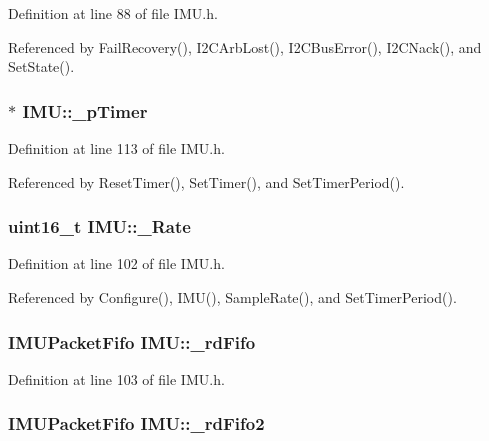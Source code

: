 Definition at line 88 of file IMU.h.



Referenced by FailRecovery(), I2CArbLost(), I2CBusError(), I2CNack(), and SetState().

\hypertarget{class_i_m_u_a16e73b1457a346aed16d4b61fae7f2c4}{
\subsubsection[{\_\-pTimer}]{$\ast$ {\bf IMU::\_\-pTimer}}}
\label{class_i_m_u_a16e73b1457a346aed16d4b61fae7f2c4}


Definition at line 113 of file IMU.h.



Referenced by ResetTimer(), SetTimer(), and SetTimerPeriod().

\hypertarget{class_i_m_u_aafe9be107385c7ccedeb1539cf6d7fce}{
\subsubsection[{\_\-Rate}]{\setlength{\rightskip}{0pt plus 5cm}uint16\_\-t {\bf IMU::\_\-Rate}}}
\label{class_i_m_u_aafe9be107385c7ccedeb1539cf6d7fce}


Definition at line 102 of file IMU.h.



Referenced by Configure(), IMU(), SampleRate(), and SetTimerPeriod().

\hypertarget{class_i_m_u_a43cbdffbfb85749212ede7f78ab6f1e0}{
\subsubsection[{\_\-rdFifo}]{\setlength{\rightskip}{0pt plus 5cm}IMUPacketFifo {\bf IMU::\_\-rdFifo}}}
\label{class_i_m_u_a43cbdffbfb85749212ede7f78ab6f1e0}


Definition at line 103 of file IMU.h.

\hypertarget{class_i_m_u_a8eb715f35f45943bedc2b9280c3f2cd3}{
\subsubsection[{\_\-rdFifo2}]{\setlength{\rightskip}{0pt plus 5cm}IMUPacketFifo {\bf IMU::\_\-rdFifo2}}}
\label{class_i_m_u_a8eb715f35f45943bedc2b9280c3f2cd3}


